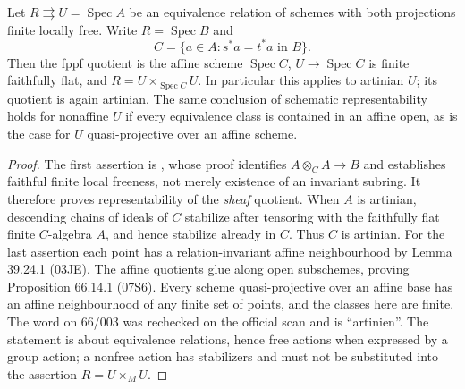 \begin{theorem}\label{thm:B3-artinian}
Let $R\rightrightarrows U=\operatorname{Spec}A$ be an equivalence
relation of schemes with both projections finite locally free.
Write $R=\operatorname{Spec}B$ and
\[
 C=\{a\in A:s^*a=t^*a\text{ in }B\}.
\]
Then the fppf quotient is the affine scheme $\operatorname{Spec}C$,
$U\to\operatorname{Spec}C$ is finite faithfully flat, and
$R=U\times_{\operatorname{Spec}C}U$.
In particular this applies to artinian $U$; its quotient is again
artinian. The same conclusion of schematic representability holds
for nonaffine $U$ if every equivalence class is contained in an affine
open, as is the case for $U$ quasi-projective over an affine scheme.
\end{theorem}
\begin{proof}
The first assertion is \cite[Proposition 39.23.9, tag 03BM]{BStacks},
whose proof identifies $A\otimes_C A\to B$ and establishes faithful
finite local freeness, not merely existence of an invariant subring.
It therefore proves representability of the \emph{sheaf} quotient.
When $A$ is artinian, descending chains of ideals of $C$ stabilize
after tensoring with the faithfully flat finite $C$-algebra $A$,
and hence stabilize already in $C$. Thus $C$ is artinian.
For the last assertion each point has a relation-invariant affine
neighbourhood by Lemma 39.24.1 (03JE). The affine quotients glue
along open subschemes, proving Proposition 66.14.1 (07S6).
Every scheme quasi-projective over an affine base has an affine
neighbourhood of any finite set of points, and the classes here are
finite. The word on
66/003 was rechecked on the official scan and is ``artinien''.
The statement is about equivalence relations, hence free actions
when expressed by a group action; a nonfree action has stabilizers
and must not be substituted into the assertion $R=U\times_MU$.
\end{proof}

